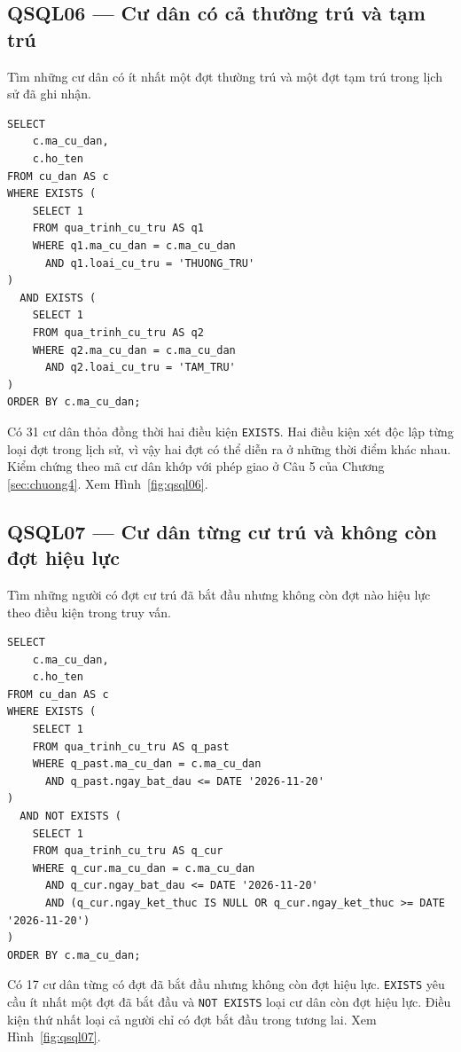 \noindent\begin{minipage}{\linewidth}
\subsection*{QSQL06 --- Cư dân có cả thường trú và tạm trú}

Tìm những cư dân có ít nhất một đợt thường trú và một đợt tạm trú trong lịch sử đã ghi nhận.

\begin{lstlisting}[style=sqlvn]
SELECT
    c.ma_cu_dan,
    c.ho_ten
FROM cu_dan AS c
WHERE EXISTS (
    SELECT 1
    FROM qua_trinh_cu_tru AS q1
    WHERE q1.ma_cu_dan = c.ma_cu_dan
      AND q1.loai_cu_tru = 'THUONG_TRU'
)
  AND EXISTS (
    SELECT 1
    FROM qua_trinh_cu_tru AS q2
    WHERE q2.ma_cu_dan = c.ma_cu_dan
      AND q2.loai_cu_tru = 'TAM_TRU'
)
ORDER BY c.ma_cu_dan;
\end{lstlisting}

Có 31 cư dân thỏa đồng thời hai điều kiện \texttt{EXISTS}. Hai điều kiện xét độc lập từng loại đợt trong lịch sử, vì vậy hai đợt có thể diễn ra ở những thời điểm khác nhau. Kiểm chứng theo mã cư dân khớp với phép giao ở Câu 5 của Chương \ref{sec:chuong4}. Xem Hình~\ref{fig:qsql06}.
\end{minipage}\par\medskip

\noindent\begin{minipage}{\linewidth}
\subsection*{QSQL07 --- Cư dân từng cư trú và không còn đợt hiệu lực}

Tìm những người có đợt cư trú đã bắt đầu nhưng không còn đợt nào hiệu lực theo điều kiện trong truy vấn.

\begin{lstlisting}[style=sqlvn]
SELECT
    c.ma_cu_dan,
    c.ho_ten
FROM cu_dan AS c
WHERE EXISTS (
    SELECT 1
    FROM qua_trinh_cu_tru AS q_past
    WHERE q_past.ma_cu_dan = c.ma_cu_dan
      AND q_past.ngay_bat_dau <= DATE '2026-11-20'
)
  AND NOT EXISTS (
    SELECT 1
    FROM qua_trinh_cu_tru AS q_cur
    WHERE q_cur.ma_cu_dan = c.ma_cu_dan
      AND q_cur.ngay_bat_dau <= DATE '2026-11-20'
      AND (q_cur.ngay_ket_thuc IS NULL OR q_cur.ngay_ket_thuc >= DATE '2026-11-20')
)
ORDER BY c.ma_cu_dan;
\end{lstlisting}

Có 17 cư dân từng có đợt đã bắt đầu nhưng không còn đợt hiệu lực. \texttt{EXISTS} yêu cầu ít nhất một đợt đã bắt đầu và \texttt{NOT EXISTS} loại cư dân còn đợt hiệu lực. Điều kiện thứ nhất loại cả người chỉ có đợt bắt đầu trong tương lai. Xem Hình~\ref{fig:qsql07}.
\end{minipage}\par\medskip

